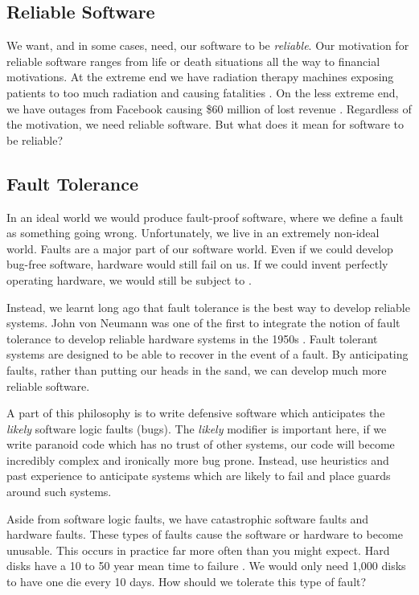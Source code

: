 \subsection{Reliable Software}
We want, and in some cases, need, our software to be \textsl{reliable}.
Our motivation for reliable software ranges from life or death situations all the way to financial motivations.
At the extreme end we have radiation therapy machines exposing patients to too much radiation and causing fatalities \cite{therac}.
On the less extreme end,
we have outages from Facebook causing \$60 million of lost revenue \cite{facebook-outage}.
Regardless of the motivation,
we need reliable software.
But what does it mean for software to be reliable?

\subsection{Fault Tolerance}
In an ideal world we would produce fault-proof software,
where we define a fault as something going wrong.
Unfortunately, we live in an extremely non-ideal world.
Faults are a major part of our software world.
Even if we could develop bug-free software,
hardware would still fail on us.
If we could invent perfectly operating hardware,
we would still be subject to .

Instead, we learnt long ago that fault tolerance is the best way to develop reliable systems.
John von Neumann was one of the first to integrate the notion of fault tolerance to develop reliable hardware systems in the 1950s \cite{neumann-faults}.
Fault tolerant systems are designed to be able to recover in the event of a fault.
By anticipating faults, rather than putting our heads in the sand,
we can develop much more reliable software.

A part of this philosophy is to write defensive software which anticipates the \textsl{likely} software logic faults (bugs).
The \textsl{likely} modifier is important here,
if we write paranoid code which has no trust of other systems,
our code will become incredibly complex and ironically more bug prone.
Instead, use heuristics and past experience to anticipate systems which are likely to fail and place guards around such systems.

Aside from software logic faults,
we have catastrophic software faults and hardware faults.
These types of faults cause the software or hardware to become unusable.
This occurs in practice far more often than you might expect.
Hard disks have a 10 to 50 year mean time to failure \cite{data-intensive}.
We would only need 1,000 disks to have one die every 10 days.
How should we tolerate this type of fault?

